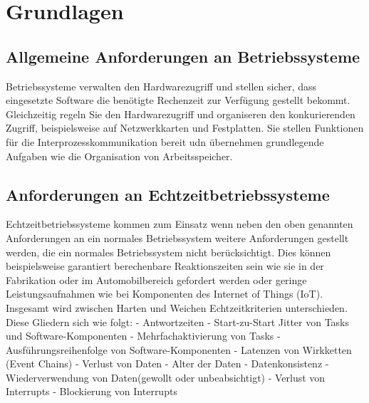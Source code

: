 \documentclass[ngerman]{seminarvorlage}
\begin{document}
\section{Grundlagen}
\subsection{Allgemeine Anforderungen an Betriebssysteme}
Betriebssysteme verwalten den Hardwarezugriff und stellen sicher, dass eingesetzte Software die benötigte Rechenzeit zur Verfügung gestellt bekommt. Gleichzeitig regeln Sie den Hardwarezugriff und organiseren den konkurierenden Zugriff, beispielsweise auf Netzwerkkarten und Festplatten. Sie stellen Funktionen für die Interprozesskommunikation bereit udn übernehmen grundlegende Aufgaben wie die Organisation von Arbeitsspeicher.
\subsection{Anforderungen an Echtzeitbetriebssysteme}
Echtzeitbetriebssysteme kommen zum Einsatz wenn neben den oben genannten Anforderungen an ein normales Betriebssystem weitere Anforderungen gestellt werden, die ein normales Betriebssystem nicht berücksichtigt. Dies können beispielsweise garantiert berechenbare Reaktionszeiten sein wie sie in der Fabrikation oder im Automobilbereich gefordert werden oder geringe Leistungsaufnahmen wie bei Komponenten des Internet of Things (IoT). Insgesamt wird zwischen Harten und Weichen Echtzeitkriterien unterschieden. Diese Gliedern sich wie folgt:\newline
- Antwortzeiten\newline
- Start-zu-Start Jitter von Tasks und Software-Komponenten\newline
- Mehrfachaktivierung von Tasks\newline
- Ausführungsreihenfolge von Software-Komponenten\newline
- Latenzen von Wirkketten (Event Chains)\newline
- Verlust von Daten\newline
- Alter der Daten\newline
- Datenkonsistenz\newline
- Wiederverwendung von Daten(gewollt oder unbeabsichtigt)\newline
- Verlust von Interrupts\newline
- Blockierung von Interrupts\newline
\end{document}
